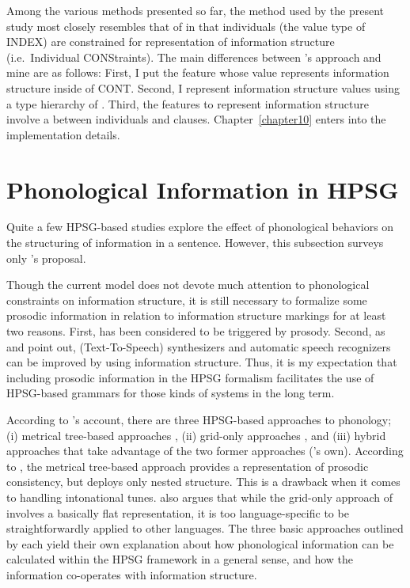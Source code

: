 Among the various methods presented so far, the method used by the
present study most closely resembles that of \citet{paggio:09} in that
individuals (the value type of INDEX) are constrained for
representation of information structure (i.e.\ Individual
CONStraints). The main differences between
\citeauthor{paggio:09}'s approach and mine are as follows: First, I
put the feature whose value represents information structure inside of
CONT. Second, I represent information structure values using a type
hierarchy of . Third, the features
to represent information structure involve a 
between individuals and clauses. Chapter~\ref{chapter10} enters into
the implementation details.




\section{Phonological Information in HPSG}
\label{8:sec:phonology}

Quite a few HPSG-based studies explore the effect of phonological
behaviors on the structuring of information in a sentence.  However,
this subsection surveys only \citeauthor{bildhauer:07}'s
proposal.


Though the current model does not devote much attention to
phonological constraints on information structure, it is still
necessary to formalize some prosodic information in relation to
information structure markings for at least two reasons. First,
 has been considered to be triggered by
prosody. Second, as \citet{kuhn:96} and \citet{traat:bos:04} point
out,  (Text-To-Speech) synthesizers and automatic speech
recognizers can be improved by using information structure. Thus, it
is my expectation that including prosodic information in the HPSG
formalism facilitates the use of HPSG-based grammars for those kinds
of systems in the long term.



According to \citet{bildhauer:07}'s account, there are three
HPSG-based approaches to phonology; (i) metrical tree-based approaches
\citep{klein:00,haji:03}, (ii) grid-only approaches
\citep{bonami:delais:06}, and (iii) hybrid approaches that take
advantage of the two former approaches (\citeauthor{bildhauer:07}'s
own).  According to \citet[p.\ 160]{bildhauer:07}, the metrical
tree-based approach provides a representation of prosodic consistency,
but deploys only nested structure. This is a drawback when it comes to
handling intonational tunes.  \citeauthor{bildhauer:07} also argues
that while the grid-only approach of \citeauthor{bonami:delais:06}
involves a basically flat representation, it is too language-specific
to be straightforwardly applied to other languages. The three basic
approaches outlined by \citeauthor{bildhauer:07} each yield their own
explanation about how phonological information can be calculated
within the HPSG framework in a general sense, and how the information
co-operates with information structure.


